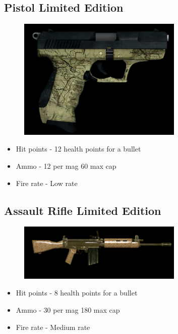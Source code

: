     \subsection{Pistol Limited Edition}
        \begin{figure}[H]
            \centering
            \includegraphics[width=0.7\textwidth]{images/weapons/drake}
        \end{figure}
        \begin{itemize}
            \item Hit points - 12 health points for a bullet
            \item Ammo - 12 per mag 60 max cap
            \item Fire rate - Low rate
        \end{itemize}
    \subsection{Assault Rifle Limited Edition}
        \begin{figure}[H]
            \centering
            \includegraphics[width=0.7\textwidth]{images/weapons/assault}
        \end{figure}
        \begin{itemize}
            \item Hit points - 8 health points for a bullet
            \item Ammo - 30 per mag 180 max cap
            \item Fire rate - Medium rate
        \end{itemize}
